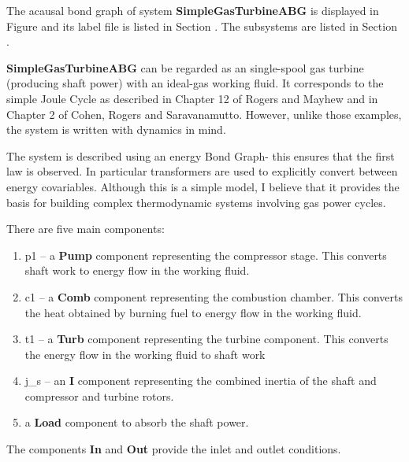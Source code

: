 

   The acausal bond graph of system \textbf{SimpleGasTurbineABG} is
   displayed in Figure  and its label
   file is listed in Section .
   The subsystems are listed in Section .
   
   \textbf{SimpleGasTurbineABG} can be regarded as an single-spool gas
   turbine (producing shaft power) with an ideal-gas working fluid. It
   corresponds to the simple Joule Cycle as described in Chapter 12 of
   Rogers and Mayhew and in Chapter 2 of Cohen, Rogers and
   Saravanamutto. However, unlike those examples, the system is
   written with dynamics in mind.
   
   The system is described using an energy Bond Graph- this ensures
   that the first law is observed. In particular transformers are used
   to explicitly convert between energy covariables. Although this is
   a simple model, I believe that it provides the basis for building
   complex thermodynamic systems involving gas power cycles.


There are five main components:
\begin{enumerate}
\item p1 -- a \textbf{Pump} component representing the compressor
  stage. This converts shaft work to energy flow in the working fluid.
\item c1 -- a \textbf{Comb} component representing the combustion
  chamber. This converts the heat obtained by burning fuel to energy
  flow in the working fluid.
\item t1 -- a \textbf{Turb} component representing the turbine
  component. This converts the energy flow in the working fluid to
  shaft work
\item j\_s -- an \textbf{I} component representing the combined inertia
  of the shaft and compressor and turbine rotors.
\item a \textbf{Load} component to absorb the shaft power.
\end{enumerate}
The components \textbf{In} and \textbf{Out} provide the inlet and
outlet conditions.

